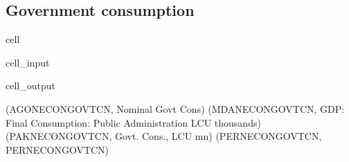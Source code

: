 \documentclass[letterpaper,10pt,english]{jupyterBook}
\begin{document}
\subsection{Government consumption}
\label{\detokenize{content/howto/onboard/eviews/onboard many models from wf1:government-consumption}}
\begin{sphinxuseclass}{cell}\begin{sphinxVerbatimInput}

\begin{sphinxuseclass}{cell_input}
\begin{sphinxVerbatim}[commandchars=\\\{\}]
\end{sphinxVerbatim}

\end{sphinxuseclass}\end{sphinxVerbatimInput}
\begin{sphinxVerbatimOutput}

\begin{sphinxuseclass}{cell_output}
\begin{sphinxVerbatim}[commandchars=\\\{\}]
(\PYGZsq{}AGONECONGOVTCN\PYGZsq{}, \PYGZsq{}Nominal Govt Cons\PYGZsq{})
(\PYGZsq{}MDANECONGOVTCN\PYGZsq{}, \PYGZsq{}GDP: Final Consumption: Public Administration LCU thousands\PYGZsq{})
(\PYGZsq{}PAKNECONGOVTCN\PYGZsq{}, \PYGZsq{}Govt. Cons., LCU mn\PYGZsq{})
(\PYGZsq{}PERNECONGOVTCN\PYGZsq{}, \PYGZsq{}PERNECONGOVTCN\PYGZsq{})
\end{sphinxVerbatim}

\end{sphinxuseclass}\end{sphinxVerbatimOutput}

\end{sphinxuseclass}
\end{document}
